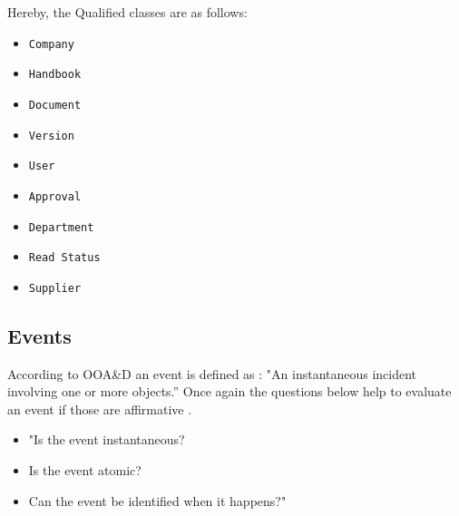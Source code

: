 Hereby, the Qualified classes are as follows:
\begin{multicols}{4}
	\begin{itemize} 
	\item \texttt{Company}
	\item \texttt{Handbook}
	\item \texttt{Document}
	\item \texttt{Version}
	\item \texttt{User}
	\item \texttt{Approval}
	\item \texttt{Department}
	\item \texttt{Read Status}
	\item \texttt{Supplier}
	\end{itemize}
\end{multicols}

\subsection{Events} \label{sec:Events}
According to OOA\&D an event is defined as \citep[p.~53]{Rod-Aalborg}:
"An instantaneous incident involving one or more objects.''
Once again the questions below help to evaluate an event if those are affirmative \citep[p.~65]{Rod-Aalborg}.
\begin{itemize}
	\item "Is the event instantaneous?
	\item Is the event atomic?
	\item Can the event be identified when it happens?"
\end{itemize}

